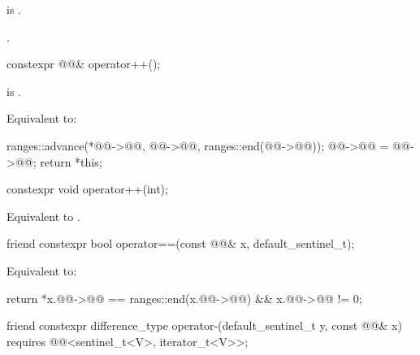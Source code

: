\begin{itemdescr}
\pnum
\expects
{} is .

\pnum
\returns
{}.
\end{itemdescr}

%
\begin{itemdecl}
constexpr @@& operator++();
\end{itemdecl}

\begin{itemdescr}
\pnum
\expects
{} is .

\pnum
\effects
Equivalent to:
\begin{codeblock}
ranges::advance(*@@->@@, @@->@@, ranges::end(@@->@@));
@@->@@ = @@->@@;
return *this;
\end{codeblock}
\end{itemdescr}

%
\begin{itemdecl}
constexpr void operator++(int);
\end{itemdecl}

\begin{itemdescr}
\pnum
\effects
Equivalent to .
\end{itemdescr}

%
\begin{itemdecl}
friend constexpr bool operator==(const @@& x, default_sentinel_t);
\end{itemdecl}

\begin{itemdescr}
\pnum
\effects
Equivalent to:
\begin{codeblock}
return *x.@@->@@ == ranges::end(x.@@->@@) && x.@@->@@ != 0;
\end{codeblock}
\end{itemdescr}

%
\begin{itemdecl}
friend constexpr difference_type operator-(default_sentinel_t y, const @@& x)
  requires @@<sentinel_t<V>, iterator_t<V>>;
\end{itemdecl}

